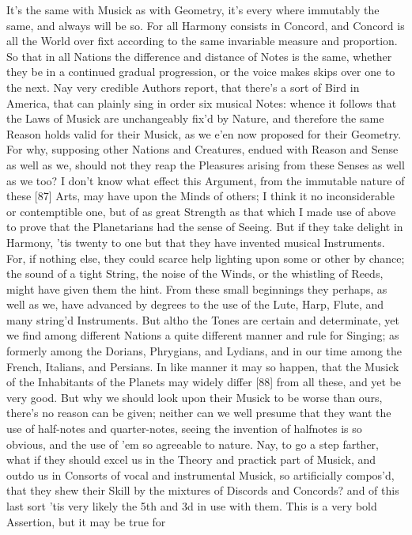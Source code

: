 \documentclass[letterpaper]{book}
\begin{document}
It's the same with Musick as with Geometry, it's every where immutably the
same, and always will be so. For all Harmony consists in Concord, and
Concord is all the World over fixt according to the same invariable measure
and proportion. So that in all Nations the difference and distance of Notes
is the same, whether they be in a continued gradual progression, or the
voice makes skips over one to the next. Nay very credible Authors report,
that there's a sort of Bird in America, that can plainly sing in order six
musical Notes: whence it follows that the Laws of Musick are unchangeably
fix'd by Nature, and therefore the same Reason holds valid for their Musick,
as we e'en now proposed for their Geometry. For why, supposing other Nations
and Creatures, endued with Reason and Sense as well as we, should not they
reap the Pleasures arising from these Senses as well as we too? I don't know
what effect this Argument, from the immutable nature of these [87] Arts, may
have upon the Minds of others; I think it no inconsiderable or contemptible
one, but of as great Strength as that which I made use of above to prove
that the Planetarians had the sense of Seeing.  But if they take delight in
Harmony, 'tis twenty to one but that they have invented musical Instruments.
For, if nothing else, they could scarce help lighting upon some or other by
chance; the sound of a tight String, the noise of the Winds, or the
whistling of Reeds, might have given them the hint.  From these small
beginnings they perhaps, as well as we, have advanced by degrees to the use
of the Lute, Harp, Flute, and many string'd Instruments.  But altho the
Tones are certain and determinate, yet we find among different Nations a
quite different manner and rule for Singing; as formerly among the Dorians,
Phrygians, and Lydians, and in our time among the French, Italians, and
Persians. In like manner it may so happen, that the Musick of the
Inhabitants of the Planets may widely differ [88] from all these, and yet be
very good. But why we should look upon their Musick to be worse than ours,
there's no reason can be given; neither can we well presume that they want
the use of half-notes and quarter-notes, seeing the invention of halfnotes
is so obvious, and the use of 'em so agreeable to nature. Nay, to go a step
farther, what if they should excel us in the Theory and practick part of
Musick, and outdo us in Consorts of vocal and instrumental Musick, so
artificially compos'd, that they shew their Skill by the mixtures of
Discords and Concords? and of this last sort 'tis very likely the 5th and 3d
in use with them.  This is a very bold Assertion, but it may be true for
\end{document}
